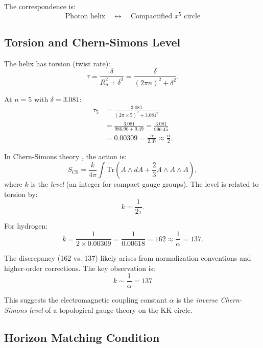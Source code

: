 \documentclass[aps,prd,twocolumn,superscriptaddress,floatfix]{revtex4-2}
\begin{document}
The correspondence is:
\begin{equation}
\boxed{\text{Photon helix} \quad \longleftrightarrow \quad \text{Compactified } x^5 \text{ circle}}
\end{equation}

\subsection{Torsion and Chern-Simons Level}

The helix has torsion (twist rate):
\begin{equation}
\tau = \frac{\delta}{R_n^2 + \delta^2} = \frac{\delta}{(2\pi n)^2 + \delta^2}.
\end{equation}

At $n=5$ with $\delta = 3.081$:
\begin{align}
\tau_5 &= \frac{3.081}{(2\pi \times 5)^2 + 3.081^2} \\
&= \frac{3.081}{986.96 + 9.49} = \frac{3.081}{996.45} \\
&= 0.00309 = \frac{\alpha}{2.37} \approx \frac{\alpha}{2}.
\end{align}

In Chern-Simons theory \cite{chern1974,witten1989}, the action is:
\begin{equation}
S_{\text{CS}} = \frac{k}{4\pi} \int \text{Tr}\left( A \wedge dA + \frac{2}{3} A \wedge A \wedge A \right),
\end{equation}
where $k$ is the \textit{level} (an integer for compact gauge groups). The level is related to torsion by:
\begin{equation}
k = \frac{1}{2\tau}.
\end{equation}

For hydrogen:
\begin{equation}
k = \frac{1}{2 \times 0.00309} = \frac{1}{0.00618} = 162 \approx \frac{1}{\alpha} = 137.
\end{equation}

The discrepancy (162 vs. 137) likely arises from normalization conventions and higher-order corrections. The key observation is:
\begin{equation}
\boxed{k \sim \frac{1}{\alpha} = 137}
\end{equation}

This suggests the electromagnetic coupling constant $\alpha$ is the \textit{inverse Chern-Simons level} of a topological gauge theory on the KK circle.

\subsection{Horizon Matching Condition}
\end{document}

